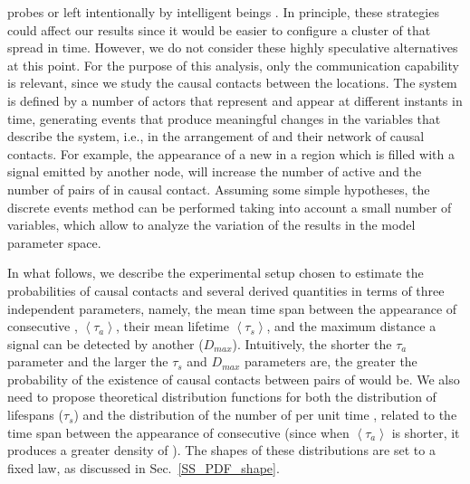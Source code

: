 probes or left intentionally by intelligent beings \citep[see, e.g.,
][]{peters_outer_2018, barlow_galactic_2013}.
%
In principle, these strategies could affect our results since it would
be easier to configure a cluster of \cetis{} that spread in time.
%
However, we do not consider these highly speculative alternatives at
this point.
%
For the purpose of this analysis, only the communication capability is
relevant, since we study the causal contacts between the locations.
%
The system is defined by a number of actors that represent \cetis{}
and appear at different instants in time, generating events that
produce meaningful changes in the variables that describe the system,
i.e., in the arrangement of \cetis{} and their network of causal
contacts.
%
For example, the appearance of a new \ceti{} in a region which is
filled with a signal emitted by another node, will increase the
number of active \cetis{} and the number of pairs of \cetis{} in
causal contact.
%
Assuming some simple hypotheses, the discrete events method can be
performed taking into account a small number of variables, which allow
to analyze the variation of the results in the model parameter space.


In what follows, we describe the experimental setup chosen to estimate
the probabilities of causal contacts and several derived quantities in
terms of three independent parameters, namely, the mean time span
between the appearance of consecutive \cetis{}, $\left<\tau_a\right>$,
their mean lifetime $\left<\tau_s\right>$, and the maximum distance a
signal can be detected by another \ceti{} ($D_{max}$).
%
Intuitively, the shorter the $\tau_a$ parameter and the larger the
$\tau_s$ and $D_{max}$ parameters are, the greater the probability of
the existence of causal contacts between pairs of \cetis{} would be.
%
We also need to propose theoretical distribution functions for both
the distribution of lifespans ($\tau_s$) and the distribution of the
number of \cetis{} per unit time \citep{maccone_evolution_2014,
Sotos_biotechnology_2019}, related to the time span between the
appearance of consecutive \cetis{} (since when $\left<\tau_a\right>$
is shorter, it produces a greater density of \cetis{}).
%
The shapes of these distributions are set to a fixed law, as discussed
in Sec.~\ref{SS_PDF_shape}.
     

